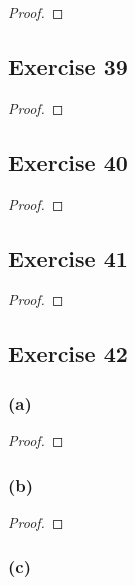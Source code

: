 \documentclass[14pt]{extarticle}
\begin{document}
\begin{proof}

\end{proof}

\subsection{Exercise 39}

\begin{proof}

\end{proof}

\subsection{Exercise 40}

\begin{proof}

\end{proof}

\subsection{Exercise 41}

\begin{proof}

\end{proof}

\subsection{Exercise 42}

\subsubsection{(a)}

\begin{proof}

\end{proof}

\subsubsection{(b)}

\begin{proof}

\end{proof}

\subsubsection{(c)}
\end{document}
